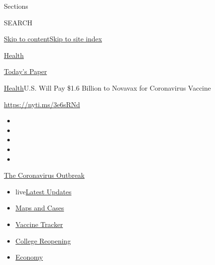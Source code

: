 Sections

SEARCH

\protect\hyperlink{site-content}{Skip to
content}\protect\hyperlink{site-index}{Skip to site index}

\href{https://www.nytimes3xbfgragh.onion/section/health}{Health}

\href{https://myaccount.nytimes3xbfgragh.onion/auth/login?response_type=cookie\&client_id=vi}{}

\href{https://www.nytimes3xbfgragh.onion/section/todayspaper}{Today's
Paper}

\href{/section/health}{Health}\textbar{}U.S. Will Pay \$1.6 Billion to
Novavax for Coronavirus Vaccine

\url{https://nyti.ms/3e6sRNd}

\begin{itemize}
\item
\item
\item
\item
\item
\end{itemize}

\href{https://www.nytimes3xbfgragh.onion/news-event/coronavirus?action=click\&pgtype=Article\&state=default\&region=TOP_BANNER\&context=storylines_menu}{The
Coronavirus Outbreak}

\begin{itemize}
\tightlist
\item
  live\href{https://www.nytimes3xbfgragh.onion/2020/08/03/world/coronavirus-covid-19.html?action=click\&pgtype=Article\&state=default\&region=TOP_BANNER\&context=storylines_menu}{Latest
  Updates}
\item
  \href{https://www.nytimes3xbfgragh.onion/interactive/2020/us/coronavirus-us-cases.html?action=click\&pgtype=Article\&state=default\&region=TOP_BANNER\&context=storylines_menu}{Maps
  and Cases}
\item
  \href{https://www.nytimes3xbfgragh.onion/interactive/2020/science/coronavirus-vaccine-tracker.html?action=click\&pgtype=Article\&state=default\&region=TOP_BANNER\&context=storylines_menu}{Vaccine
  Tracker}
\item
  \href{https://www.nytimes3xbfgragh.onion/2020/08/02/us/covid-college-reopening.html?action=click\&pgtype=Article\&state=default\&region=TOP_BANNER\&context=storylines_menu}{College
  Reopening}
\item
  \href{https://www.nytimes3xbfgragh.onion/live/2020/08/03/business/stock-market-today-coronavirus?action=click\&pgtype=Article\&state=default\&region=TOP_BANNER\&context=storylines_menu}{Economy}
\end{itemize}

